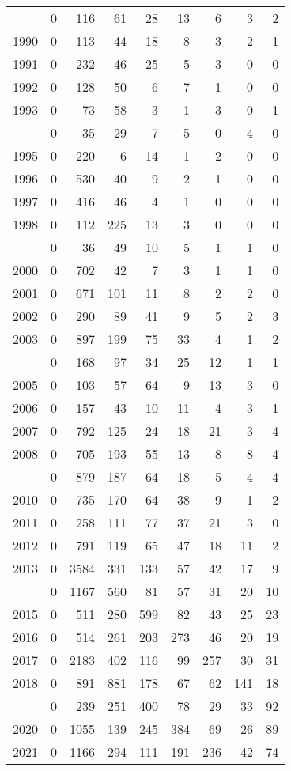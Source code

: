 \documentclass[
]{article}
\begin{document}
\begin{longtable}[t]{lrrrrrrrr}
\endfoot
\bottomrule
\endlastfoot
1989 & 0 & 116 & 61 & 28 & 13 & 6 & 3 & 2\\
1990 & 0 & 113 & 44 & 18 & 8 & 3 & 2 & 1\\
1991 & 0 & 232 & 46 & 25 & 5 & 3 & 0 & 0\\
1992 & 0 & 128 & 50 & 6 & 7 & 1 & 0 & 0\\
1993 & 0 & 73 & 58 & 3 & 1 & 3 & 0 & 1\\
\addlinespace
1994 & 0 & 35 & 29 & 7 & 5 & 0 & 4 & 0\\
1995 & 0 & 220 & 6 & 14 & 1 & 2 & 0 & 0\\
1996 & 0 & 530 & 40 & 9 & 2 & 1 & 0 & 0\\
1997 & 0 & 416 & 46 & 4 & 1 & 0 & 0 & 0\\
1998 & 0 & 112 & 225 & 13 & 3 & 0 & 0 & 0\\
\addlinespace
1999 & 0 & 36 & 49 & 10 & 5 & 1 & 1 & 0\\
2000 & 0 & 702 & 42 & 7 & 3 & 1 & 1 & 0\\
2001 & 0 & 671 & 101 & 11 & 8 & 2 & 2 & 0\\
2002 & 0 & 290 & 89 & 41 & 9 & 5 & 2 & 3\\
2003 & 0 & 897 & 199 & 75 & 33 & 4 & 1 & 2\\
\addlinespace
2004 & 0 & 168 & 97 & 34 & 25 & 12 & 1 & 1\\
2005 & 0 & 103 & 57 & 64 & 9 & 13 & 3 & 0\\
2006 & 0 & 157 & 43 & 10 & 11 & 4 & 3 & 1\\
2007 & 0 & 792 & 125 & 24 & 18 & 21 & 3 & 4\\
2008 & 0 & 705 & 193 & 55 & 13 & 8 & 8 & 4\\
\addlinespace
2009 & 0 & 879 & 187 & 64 & 18 & 5 & 4 & 4\\
2010 & 0 & 735 & 170 & 64 & 38 & 9 & 1 & 2\\
2011 & 0 & 258 & 111 & 77 & 37 & 21 & 3 & 0\\
2012 & 0 & 791 & 119 & 65 & 47 & 18 & 11 & 2\\
2013 & 0 & 3584 & 331 & 133 & 57 & 42 & 17 & 9\\
\addlinespace
2014 & 0 & 1167 & 560 & 81 & 57 & 31 & 20 & 10\\
2015 & 0 & 511 & 280 & 599 & 82 & 43 & 25 & 23\\
2016 & 0 & 514 & 261 & 203 & 273 & 46 & 20 & 19\\
2017 & 0 & 2183 & 402 & 116 & 99 & 257 & 30 & 31\\
2018 & 0 & 891 & 881 & 178 & 67 & 62 & 141 & 18\\
\addlinespace
2019 & 0 & 239 & 251 & 400 & 78 & 29 & 33 & 92\\
2020 & 0 & 1055 & 139 & 245 & 384 & 69 & 26 & 89\\
2021 & 0 & 1166 & 294 & 111 & 191 & 236 & 42 & 74\\*
\end{longtable}
\end{document}
